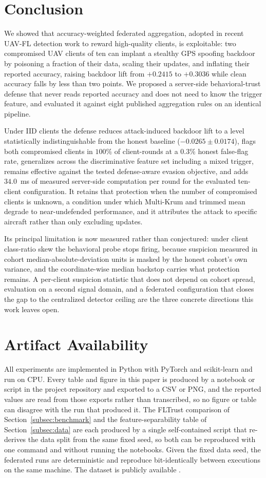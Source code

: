 \documentclass[journal]{IEEEtran}
\begin{document}
\section{Conclusion}
We showed that accuracy-weighted federated aggregation, adopted in recent UAV-FL detection work to reward high-quality clients, is exploitable: two compromised UAV clients of ten can implant a stealthy GPS spoofing backdoor by poisoning a fraction of their data, scaling their updates, and inflating their reported accuracy, raising backdoor lift from $+0.2415$ to $+0.3036$ while clean accuracy falls by less than two points. We proposed a server-side behavioral-trust defense that never reads reported accuracy and does not need to know the trigger feature, and evaluated it against eight published aggregation rules on an identical pipeline.

Under IID clients the defense reduces attack-induced backdoor lift to a level statistically indistinguishable from the honest baseline ($-0.0265 \pm 0.0174$), flags both compromised clients in $100\%$ of client-rounds at a $0.3\%$ honest false-flag rate, generalizes across the discriminative feature set including a mixed trigger, remains effective against the tested defense-aware evasion objective, and adds $34.0$~ms of measured server-side computation per round for the evaluated ten-client configuration. It retains that protection when the number of compromised clients is unknown, a condition under which Multi-Krum and trimmed mean degrade to near-undefended performance, and it attributes the attack to specific aircraft rather than only excluding updates.

Its principal limitation is now measured rather than conjectured: under client class-ratio skew the behavioral probe stops firing, because suspicion measured in cohort median-absolute-deviation units is masked by the honest cohort's own variance, and the coordinate-wise median backstop carries what protection remains. A per-client suspicion statistic that does not depend on cohort spread, evaluation on a second signal domain, and a federated configuration that closes the gap to the centralized detector ceiling are the three concrete directions this work leaves open.

\section*{Artifact Availability}
All experiments are implemented in Python with PyTorch and scikit-learn and run on CPU. Every table and figure in this paper is produced by a notebook or script in the project repository and exported to a CSV or PNG, and the reported values are read from those exports rather than transcribed, so no figure or table can disagree with the run that produced it. The FLTrust comparison of Section~\ref{subsec:benchmark} and the feature-separability table of Section~\ref{subsec:data} are each produced by a single self-contained script that re-derives the data split from the same fixed seed, so both can be reproduced with one command and without running the notebooks. Given the fixed data seed, the federated runs are deterministic and reproduce bit-identically between executions on the same machine. The dataset is publicly available \cite{aissou2022dataset}.
\end{document}
